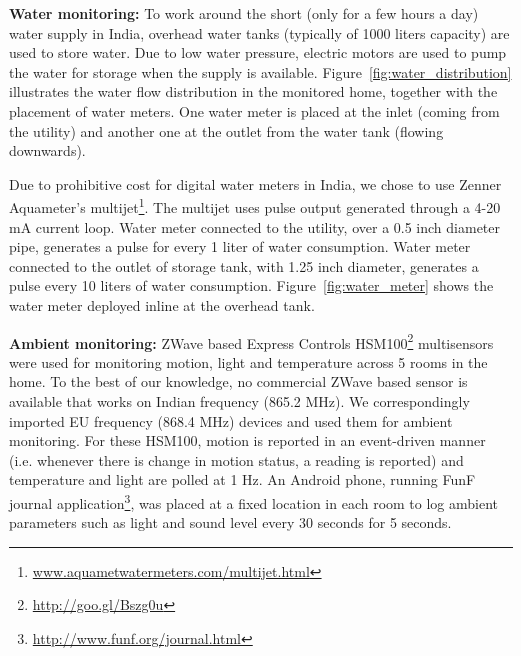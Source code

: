 \documentclass[10pt]{sensys-proc}
\newcommand{\figref}[1]{Figure~\ref{#1}}
\begin{document}
\noindent \textbf{Water monitoring:} 
To work around the short (only for a few hours a day) water supply in India, overhead water tanks (typically of 1000 liters capacity) are used to store water. Due to low water pressure, electric motors are used to pump the water for storage when the supply is available. %
\figref{fig:water_distribution} illustrates the water flow distribution in the monitored home, together with the placement of water meters. One water meter is placed at the inlet (coming from the utility) and another one at the outlet from the water tank (flowing downwards). %

Due to prohibitive cost for digital water meters in India, we chose to use Zenner Aquameter's multijet\footnote{\url{www.aquametwatermeters.com/multijet.html}}. The multijet uses pulse output generated through a 4-20 mA current loop. 
Water meter connected to the utility, over a 0.5 inch diameter pipe, generates a pulse for every 1 liter of water consumption. Water meter connected to the outlet of storage tank, with 1.25 inch diameter, generates a pulse every 10 liters of water consumption. %
\figref{fig:water_meter} shows the water meter deployed inline at the overhead tank.

\noindent \textbf{Ambient monitoring:} ZWave based Express Controls HSM100\footnote{\url{http://goo.gl/Bszg0u}} multisensors were used for monitoring motion, light and temperature across 5 rooms in the home. To the best of our knowledge, no commercial ZWave based sensor is available that works on Indian frequency (865.2 MHz). We correspondingly imported EU frequency (868.4 MHz) devices and used them for ambient monitoring. For these HSM100, motion is reported in an event-driven manner (i.e. whenever there is change in motion status, a reading is reported) and temperature and light are polled at 1 Hz. An Android phone, running FunF journal application\footnote{\url{http://www.funf.org/journal.html}}, was placed at a fixed location in each room to log ambient parameters such as light and sound level every 30 seconds for 5 seconds.
\end{document}
